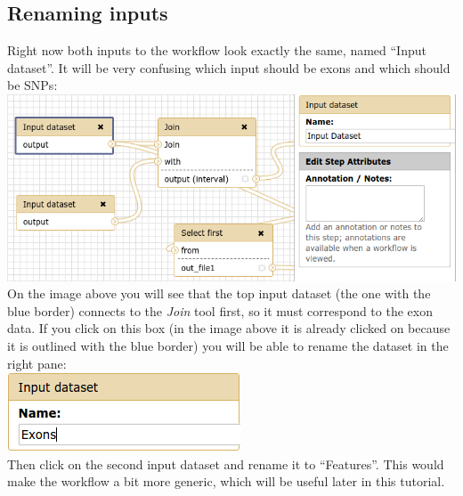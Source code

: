 \documentclass[11pt,a4paper]{article}
\begin{document}
\subsection{Renaming inputs}
Right now both inputs to the workflow look exactly the same, named ``Input dataset''. It will be very confusing which input should be exons and which should be SNPs:\\
\includegraphics[scale=0.55]{figures/101_32}\\
On the image above you will see that the top input dataset (the one with the blue border) connects to the \textit{Join} tool first, so it must correspond to the exon data. If you click on this box (in the image above it is
already clicked on because it is outlined with the blue border) you will be able to rename the dataset in the right pane:\\
\includegraphics[scale=0.55]{figures/101_33}\\
Then click on the second input dataset and rename it to ``Features''. This would make the workflow a bit more generic, which will be useful later in this tutorial.
\end{document}
